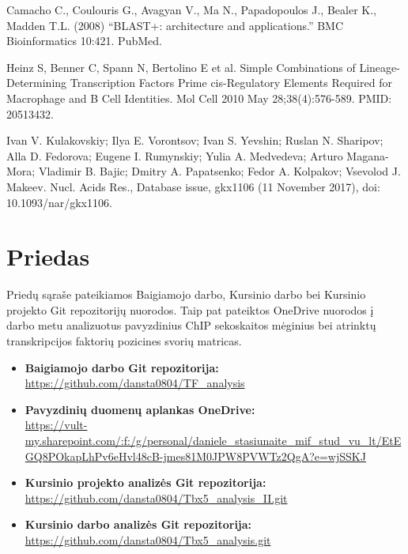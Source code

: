 \documentclass[12pt]{article}
\begin{document}
\begin{thebibliography}{99}
 Camacho C., Coulouris G., Avagyan V., Ma N., Papadopoulos J.,
Bealer K., Madden T.L. (2008) “BLAST+: architecture and applications.”
BMC Bioinformatics 10:421. PubMed.

 Heinz S, Benner C, Spann N, Bertolino E et al. Simple
Combinations of Lineage-Determining Transcription Factors Prime cis-Regulatory
Elements Required for Macrophage and B Cell Identities. Mol Cell 2010 May
28;38(4):576-589. PMID: 20513432.

 Ivan V. Kulakovskiy; Ilya E. Vorontsov; Ivan S. Yevshin;
Ruslan N. Sharipov; Alla D. Fedorova; Eugene I. Rumynskiy; Yulia A. Medvedeva;
Arturo Magana-Mora; Vladimir B. Bajic; Dmitry A. Papatsenko; Fedor A. Kolpakov;
Vsevolod J. Makeev. Nucl. Acids Res., Database issue, gkx1106
(11 November 2017), doi: 10.1093/nar/gkx1106.

\end{thebibliography}
\newpage


\section{Priedas} \label{Priedas}
Priedų sąraše pateikiamos Baigiamojo darbo, Kursinio darbo bei Kursinio projekto
Git repozitorijų nuorodos. Taip pat pateiktos OneDrive nuorodos į
darbo metu analizuotus pavyzdinius ChIP sekoskaitos mėginius bei atrinktų
transkripcijos faktorių pozicines svorių matricas.

\begin{itemize}
    \item \textbf{Baigiamojo darbo Git repozitorija:}\\
        \url{https://github.com/dansta0804/TF\_analysis}
    \item \textbf{Pavyzdinių duomenų aplankas OneDrive:}\\
        \url{https://vult-my.sharepoint.com/:f:/g/personal/daniele_stasiunaite_mif_stud_vu_lt/EtEGQ8POkapLhPv6eHvl48cB-jmes81M0JPW8PVWTz2QgA?e=wjSSKJ}
    \item \textbf{Kursinio projekto analizės Git repozitorija:}\\
        \url{https://github.com/dansta0804/Tbx5\_analysis\_II.git}
    \item \textbf{Kursinio darbo analizės Git repozitorija:}\\
        \url{https://github.com/dansta0804/Tbx5\_analysis.git}
\end{itemize}
\end{document}
